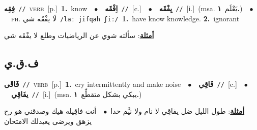 \documentclass[10pt,a4paper,twoside]{article} %
\begin{document}
\begin{multicols}{2}
{\setlength\topsep{0pt}\textbf{\foreignlanguage{arabic}{فِقِه}}\ {\color{gray}\texttt{//}\color{black}}\ \textsc{verb}\ [p.]\ \textbf{1.}~know\ \ $\bullet$\ \ \setlength\topsep{0pt}\textbf{\foreignlanguage{arabic}{اِفْقَه}}\ {\color{gray}\texttt{//}\color{black}}\ [c.]\ \ $\bullet$\ \ \setlength\topsep{0pt}\textbf{\foreignlanguage{arabic}{يِفْقَه}}\ {\color{gray}\texttt{//}\color{black}}\ [i.]\ \color{gray}(msa. \foreignlanguage{arabic}{يَعْلَم}~\foreignlanguage{arabic}{\textbf{١.}})\color{black}\ \ $\bullet$\ \ \textsc{ph.} \color{gray} \foreignlanguage{arabic}{لَا يفْقَه شي}\color{black}\ {\color{gray}\texttt{/{\sffamily laː jifqah ʃiː}/}\color{black}}\ \textbf{1.}~have know knowledge.  \textbf{2.}~ignorant\  \begin{flushright}\color{gray}\foreignlanguage{arabic}{\textbf{\underline{\foreignlanguage{arabic}{أمثلة}}}: سألته شوي عن الرياضيات وطلع لا يفْقَه شي}\end{flushright}\color{black}} \vspace{2mm}

\vspace{-3mm}
\subsection*{\color{blue}\foreignlanguage{arabic}{ف.ق.ي}\color{blue}{}} 

{\setlength\topsep{0pt}\textbf{\foreignlanguage{arabic}{فَاقَى}}\ {\color{gray}\texttt{//}\color{black}}\ \textsc{verb}\ [p.]\ \textbf{1.}~cry intermittently and make noise\ \ $\bullet$\ \ \setlength\topsep{0pt}\textbf{\foreignlanguage{arabic}{فَاقِي}}\ {\color{gray}\texttt{//}\color{black}}\ [c.]\ \ $\bullet$\ \ \setlength\topsep{0pt}\textbf{\foreignlanguage{arabic}{يفَاقِي}}\ {\color{gray}\texttt{//}\color{black}}\ [i.]\ \color{gray}(msa. \foreignlanguage{arabic}{يبكي بشكل متقطِّع}~\foreignlanguage{arabic}{\textbf{١.}})\color{black}\  \begin{flushright}\color{gray}\foreignlanguage{arabic}{\textbf{\underline{\foreignlanguage{arabic}{أمثلة}}}: طول الليل ضل يفاقِي لا نام ولا نيَّم حدا\ $\bullet$\ \  أنت فاقِيله هيك وصدقني هو رح يزهق ويرضى يعيدلك الامتحان}\end{flushright}\color{black}} \vspace{2mm}


\end{multicols}
\end{document}
